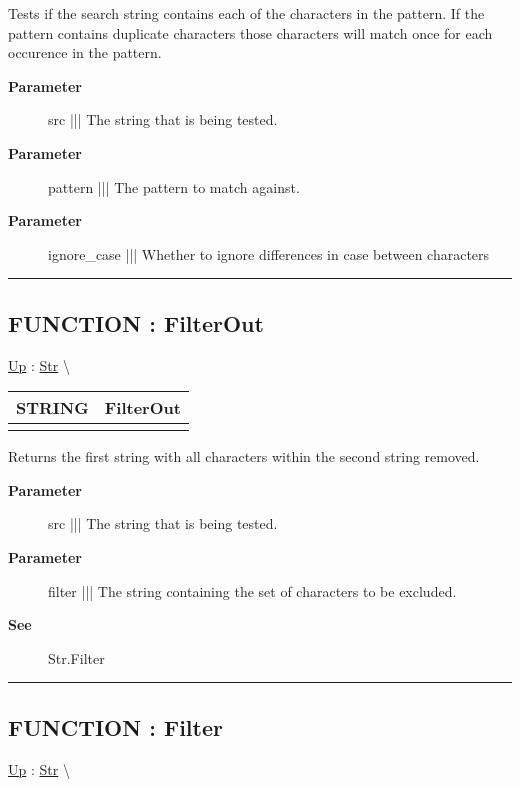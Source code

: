 \par
Tests if the search string contains each of the characters in the pattern. If the pattern contains duplicate characters those characters will match once for each occurence in the pattern.

\par
\begin{description}
\item [\textbf{Parameter}] src ||| The string that is being tested.
\item [\textbf{Parameter}] pattern ||| The pattern to match against.
\item [\textbf{Parameter}] ignore\_case ||| Whether to ignore differences in case between characters
\end{description}

\rule{\linewidth}{0.5pt}
\subsection*{FUNCTION : FilterOut}
\hypertarget{ecldoc:str.filterout}{}
\hyperlink{ecldoc:Str}{Up} :
\hspace{0pt} \hyperlink{ecldoc:Str}{Str} \textbackslash 

{\renewcommand{\arraystretch}{1.5}
\begin{tabularx}{\textwidth}{|>{\raggedright\arraybackslash}l|X|}
\hline
\hspace{0pt}STRING & FilterOut \\
\hline
\multicolumn{2}{|>{\raggedright\arraybackslash}X|}{\hspace{0pt}(STRING src, STRING filter)} \\
\hline
\end{tabularx}
}

\par
Returns the first string with all characters within the second string removed.

\par
\begin{description}
\item [\textbf{Parameter}] src ||| The string that is being tested.
\item [\textbf{Parameter}] filter ||| The string containing the set of characters to be excluded.
\item [\textbf{See}] Str.Filter
\end{description}

\rule{\linewidth}{0.5pt}
\subsection*{FUNCTION : Filter}
\hypertarget{ecldoc:str.filter}{}
\hyperlink{ecldoc:Str}{Up} :
\hspace{0pt} \hyperlink{ecldoc:Str}{Str} \textbackslash 

